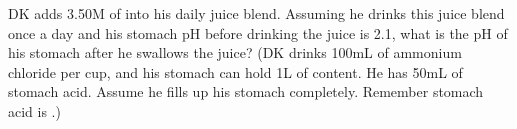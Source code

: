 \documentclass[letterpaper, 12pt]{article}
\begin{document}
\begin{problem}
DK adds 3.50M of  into his daily juice blend. Assuming he drinks this juice blend once a day and his stomach pH before drinking the juice is 2.1, what is the pH of his stomach after he swallows the juice? (DK drinks 100mL of ammonium chloride per cup, and his stomach can hold 1L of content. He has 50mL of stomach acid. Assume he fills up his stomach completely. Remember stomach acid is .)
\end{problem}
\end{document}
